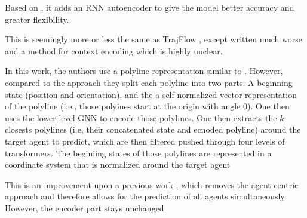 
\cite{shi2023trajectory}


\cite{bae2023eigentrajectory}


\cite{meszaros2024trajflow} Based on \cite{scholler2021flomo}, it adds an RNN autoencoder to give the model better accuracy and greater flexibility.


\cite{stefani2024mapflow} This is seemingly more or less the same as TrajFlow \cite{meszaros2024trajflow}, except written much worse and a method for context encoding which is highly unclear.



\cite{tang2024hpnet} 



\cite{zhang2024real} In this work, the authors use a polyline representation similar to \cite{gao2020vectornet}. However, compared to the approach they split each polyline into two parts: A beginning state (position and orientation), and the a self normalized vector representation of the polyline (i.e., those polyines start at the origin with angle 0). One then uses the lower level GNN to encode those polylines. One then extracts the $k$-closests polylines (i.e, their concatenated state and ecnoded polyline) around the target agent to predict, which are then filtered pushed through four levels of transformers. The beginiing states of those polylines are represented in a coordinate system that is normalized around the target agent



\cite{shi2024mtr} This is an improvement upon a previous work \cite{shi2022motion}, which removes the agent centric approach and therefore allows for the prediction of all agents simultaneously. However, the encoder part stays unchanged.
